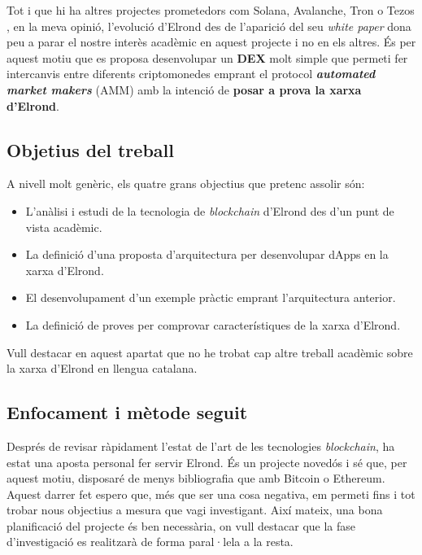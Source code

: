 \documentclass[11pt,a4paper]{article}
\begin{document}
Tot i que hi ha altres projectes prometedors com Solana, Avalanche, Tron o Tezos \cite{baro2021}, en la meva opinió, l'evolució d'Elrond des de l'aparició del seu \textit{white paper} dona peu a parar el nostre interès acadèmic en aquest projecte i no en els altres. És per aquest motiu que es proposa desenvolupar un \textbf{DEX} molt simple que permeti fer intercanvis entre diferents criptomonedes emprant el protocol \textbf{\textit{automated market makers}} (AMM) \cite{cryptopedia2021} amb la intenció de \textbf{posar a prova la xarxa d'Elrond}.

\subsection{Objetius del treball}
A nivell molt genèric, els quatre grans objectius que pretenc assolir són:
\begin{itemize}
    \item L'anàlisi i estudi de la tecnologia de \textit{blockchain} d'Elrond des d'un punt de vista acadèmic.
    \item La definició d'una proposta d'arquitectura per desenvolupar dApps en la xarxa d'Elrond.
    \item El desenvolupament d'un exemple pràctic emprant l'arquitectura anterior.
    \item La definició de proves per comprovar característiques de la xarxa d'Elrond.
\end{itemize}

Vull destacar en aquest apartat que no he trobat cap altre treball acadèmic sobre la xarxa d'Elrond en llengua catalana.

\subsection{Enfocament i mètode seguit}
Després de revisar ràpidament l'estat de l'art de les tecnologies \textit{blockchain}, ha estat una aposta personal fer servir Elrond. És un projecte novedós i sé que, per aquest motiu, disposaré de menys bibliografia que amb Bitcoin o Ethereum. Aquest darrer fet espero que, més que ser una cosa negativa, em permeti fins i tot trobar nous objectius a mesura que vagi investigant. Així mateix, una bona planificació del projecte és ben necessària, on vull destacar que la fase d'investigació es realitzarà de forma paral·lela a la resta.
\end{document}
